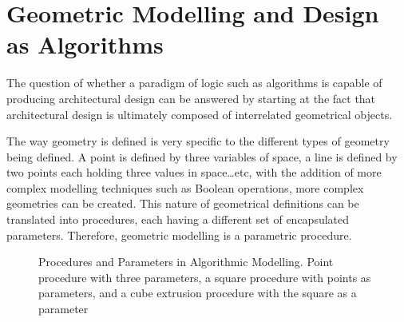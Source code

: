 \section{Geometric Modelling and Design as Algorithms}
\label{sec:GeoModel}
The question of whether a paradigm of logic such as algorithms is capable of producing architectural design can be answered by starting at the fact that architectural design is ultimately composed of interrelated geometrical objects.

The way geometry is defined is very specific to the different types of geometry being defined. A point is defined by three variables of space, a line is defined by two points each holding three values in space\ldots etc, with the addition of more complex modelling techniques such as Boolean operations, more complex geometries can be created. This nature of geometrical definitions can be translated into procedures, each having a different set of encapsulated parameters. Therefore, geometric modelling is a parametric procedure. \cite{hernandez06}

\begin{figure}[htbp]
\flushleft
{}
\centering
\vspace{5mm}
\caption[Procedures and Parameters in Algorithmic Modelling]{Procedures and Parameters in Algorithmic Modelling. {\footnotesize Point procedure with three parameters, a square procedure with points as parameters, and a cube extrusion procedure with the square as a parameter}}
\label{SqrAnalysis}
\end{figure}

